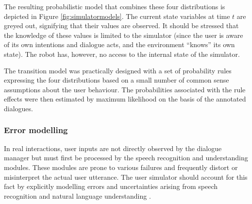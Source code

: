 The resulting probabilistic model that combines these four distributions is depicted in Figure \ref{fig:simulatormodels}. The current state variables at time $t$ are greyed out, signifying that their values are observed.  It should be stressed that the knowledge of these values is limited to the simulator (since the user is aware of its own intentions and dialogue acts, and the environment ``knows'' its own state). The robot has, however, no access to the internal state of the simulator. 

The transition model was practically designed with a set of probability rules expressing the four distributions based on a small number of common sense assumptions about the user behaviour.  The probabilities associated with the rule effects were then estimated by maximum likelihood on the basis of the annotated dialogues. 

\subsubsection*{Error modelling}

In real interactions, user inputs are not directly observed by the dialogue manager but must first be processed by the speech recognition and understanding modules.  These modules are prone to various failures and frequently distort or misinterpret the actual user utterance. The user simulator should account for this fact by explicitly modelling errors and uncertainties arising from speech recognition and natural language understanding \citep{SchatzmannTY07}. 

